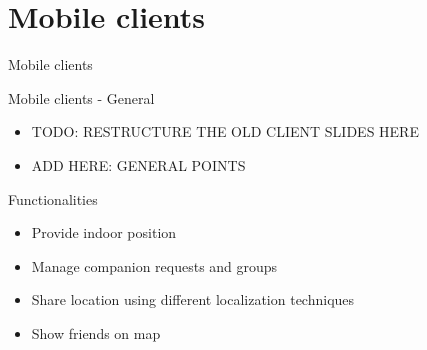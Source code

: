 \documentclass[11pt]{beamer}
\begin{document}
\section{Mobile clients}


\begin{frame}{}

  \begin{center}

    {\Huge Mobile clients}

  \end{center}

\end{frame}

\begin{frame}{Mobile clients - General}

  \begin{itemize}

    \item TODO: RESTRUCTURE THE OLD CLIENT SLIDES HERE
    \item ADD HERE: GENERAL POINTS
  \end{itemize}

  Functionalities
  \begin{itemize}
    \item Provide indoor position
    \item Manage companion requests and groups
    \item Share location using different localization techniques
    \item Show friends on map

  \end{itemize}

\end{frame}
\end{document}
